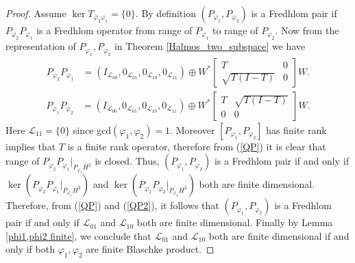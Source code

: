 \documentclass[12pt, a4 paper]{amsart}
\newcommand{\cll}{\mathcal{L}}
\theoremstyle{definition}
\theoremstyle{plain}
\theoremstyle{definition}
\numberwithin{equation}{section}
\let\phi=\varphi
\begin{document}
    \begin{proof}
Assume $\ker T_{\bar\phi_2\phi_1}=\{0\}$. By definition $(P_{\phi_1},P_{\phi_2})$ is a Fredhlom pair if $P_{\phi_2}P_{\phi_1}$ is a Fredhlom operator from range of $P_{\phi_1}$ to range of $P_{\phi_2}$. Now from the representation of $P_{\phi_1},P_{\phi_2}$ in Theorem \ref{Halmos_two_subspace} we have 
\begin{align}\label{QP}
{P_{\phi_2}P_{\phi_1}}&=(I_{\cll_{00}},0_{\cll_{01}},0_{\cll_{10}},0_{\cll_{11}})\oplus {W}^*\begin{bmatrix}
           T & 0 \\
            \sqrt{T(I-T)} & 0
        \end{bmatrix}{W}. 
\end{align}  
\begin{align}\label{QP2}
{P_{\phi_1}P_{\phi_2}}&=(I_{\cll_{00}},0_{\cll_{01}},0_{\cll_{10}},0_{\cll_{11}})\oplus {W}^*\begin{bmatrix}
           T & \sqrt{T(I-T)} \\
            0 & 0
        \end{bmatrix}{W}. 
\end{align}  
Here $\cll_{11}=\{0\}$ since gcd$(\phi_1,\phi_2)=1$.  Moreover $[P_{\phi_1},P_{\phi_2}]$ has finite rank implies that $T$ is a finite rank operator, therefore from (\ref{QP}) it is clear that range of $P_{\phi_2}P_{\phi_1}|_{P_{\phi_1}H^2}$ is closed. Thus, $(P_{\phi_1},P_{\phi_2})$ is a Fredhlom pair if and only if $\ker (P_{\phi_2}P_{\phi_1}|_{P_{\phi_1}H^2})$  and $\ker (P_{\phi_1}P_{\phi_2}|_{P_{\phi_2}H^2})$ both are finite dimensional. Therefore, from (\ref{QP}) and (\ref{QP2}), it follows that $(P_{\phi_1},P_{\phi_2})$ is a Fredhlom pair if and only if $\cll_{01}$ and $\cll_{10}$ both are finite dimensional. Finally by  Lemma \ref{phi1,phi2 finite}, we conclude that $\cll_{01}$ and $\cll_{10}$ both are finite dimensional if and only if both $\phi_1,\phi_2$ are finite Blaschke product.


\end{proof}
\end{document}
